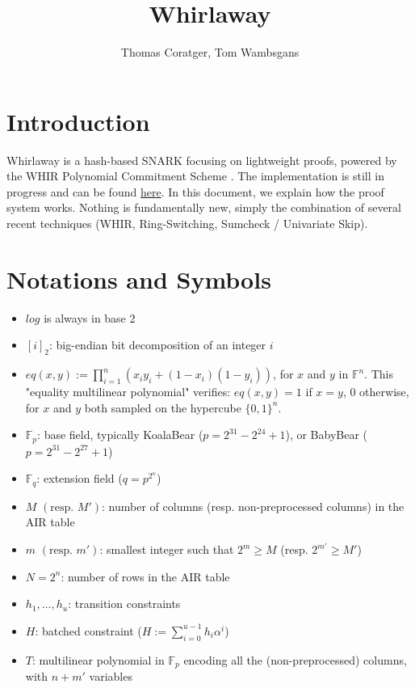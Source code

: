 \documentclass{article}
\title{Whirlaway}
\author{Thomas Coratger, Tom Wambsgans}
\date{}
\newcommand{\Fp}{\mathbb F_p}
\newcommand{\Fq}{\mathbb F_q}
\newcommand{\Pol}{T}
\begin{document}
\maketitle

\section{Introduction}

Whirlaway is a hash-based SNARK focusing on lightweight proofs, powered by the WHIR Polynomial Commitment Scheme \cite{whir}. The implementation is still in progress and can be found \href{https://github.com/TomWambsgans/Whirlaway}{here}. In this document, we explain how the proof system works. Nothing is fundamentally new, simply the combination of several recent techniques (WHIR, Ring-Switching, Sumcheck /  Univariate Skip).

\section{Notations and Symbols}

\begin{itemize}
    \item $log$ is always in base 2
    \item $[i]_2$: big-endian bit decomposition of an integer $i$
    \item $eq(x, y) := \prod_{i = 1}^{n} (x_i y_i + (1 - x_i) (1 - y_i))$, for $x$ and $y$ in $\mathbb F^n$. This "equality multilinear polynomial" verifies: $eq(x, y) = 1$ if $x = y$, $0$ otherwise, for $x$ and $y$ both sampled on the hypercube $\{0, 1\}^n$.
    \item $\Fp$: base field, typically KoalaBear ($p = 2^{31} - 2^{24} + 1$), or BabyBear ($p = 2^{31} - 2^{27} + 1$)
    \item $\Fq$: extension field ($q = p^{2^\kappa}$)
    \item $M$ $(\text{resp. } M')$: number of columns (resp. non-preprocessed columns) in the AIR table
    \item $m$ $(\text{resp. } m')$: smallest integer such that $2^m \geq M$ (resp. $2^{m'} \geq M'$)
    \item $N = 2^n$: number of rows in the AIR table
    \item $h_1, \dots, h_u$: transition constraints
    \item $H$: batched constraint ($H := \sum_{i=0}^{u-1} h_i \alpha^i $)
    \item $\Pol$: multilinear polynomial in $\Fp$ encoding all the (non-preprocessed) columns, with $n + m'$ variables
\end{itemize}
\end{document}
